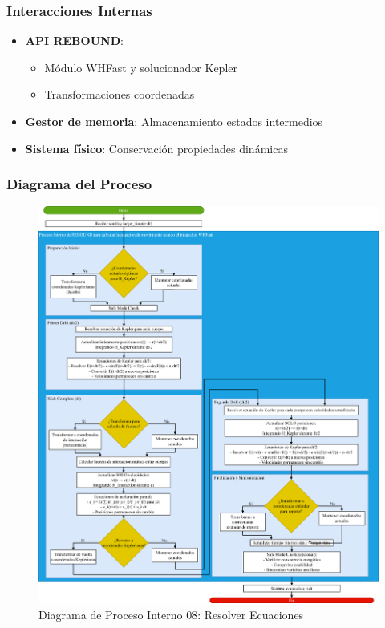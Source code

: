 \subsubsection{Interacciones Internas}
\begin{itemize}
    \item \textbf{API REBOUND}:
    \begin{itemize}
        \item Módulo WHFast y solucionador Kepler
        \item Transformaciones coordenadas
    \end{itemize}
    \item \textbf{Gestor de memoria}: Almacenamiento estados intermedios
    \item \textbf{Sistema físico}: Conservación propiedades dinámicas
\end{itemize}

\subsubsection{Diagrama del Proceso}
\begin{figure}[H]
    \centering
    \includegraphics[width=\textwidth]{img/Analisis/DiagramaProcesos/DiagramaProceso08_ResolverEcuaciones.png}
    \caption{Diagrama de Proceso Interno 08: Resolver Ecuaciones}%
    \label{fig:process_diagram08}
\end{figure}
